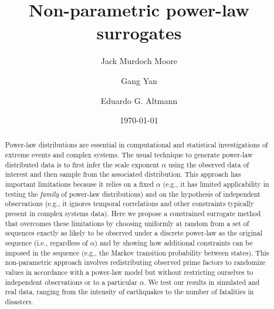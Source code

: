 \documentclass[%
prx,
reprint,
superscriptaddress,
nofootinbib,
 amsmath,amssymb,
 aps,
floatfix,
]{revtex4-2}
\begin{document}

\title{Non-parametric power-law surrogates}

\author{Jack Murdoch Moore}
%
\author{Gang Yan}%
\author{Eduardo G. Altmann}%
%

\date{\today}%

\begin{abstract}


Power-law distributions are essential in computational and statistical investigations of extreme events and complex systems. The usual technique to generate power-law distributed data is to 
first infer the scale exponent $\alpha$ using the observed data of interest and then sample from the associated distribution. 
%
This approach has important limitations because it relies on a fixed $\alpha$ (e.g., it has limited applicability in testing the {\it family} of power-law distributions) and on the hypothesis of independent observations (e.g., it ignores temporal correlations and other constraints typically present in complex systems data). 
%
Here we propose a constrained surrogate method that overcomes these limitations by choosing uniformly at random from a set of sequences exactly as likely to be observed under a discrete power-law as the original sequence (i.e., regardless of $\alpha$) and by showing how additional constraints can be imposed in the sequence (e.g., the Markov transition probability between states). 
This non-parametric approach involves redistributing observed prime factors to randomize values in accordance with a power-law model but without restricting ourselves to independent observations or to a particular $\alpha$. 
%
We test our results in simulated and real data, ranging from the intensity of earthquakes to the number of fatalities in disasters.
\end{abstract}
\end{document}

